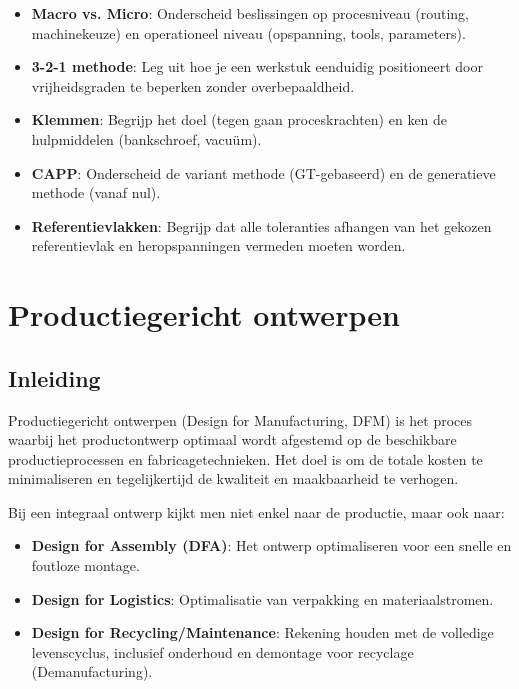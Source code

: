 \documentclass[a4paper,12pt,twoside]{report}
\begin{document}
\begin{warningbox}[title=EXAMEN CHECKLIST: WERKVOORBEREIDING]
    \begin{itemize}
        \item \textbf{Macro vs. Micro}: Onderscheid beslissingen op procesniveau (routing, machinekeuze) en operationeel niveau (opspanning, tools, parameters).
        \item \textbf{3-2-1 methode}: Leg uit hoe je een werkstuk eenduidig positioneert door vrijheidsgraden te beperken zonder overbepaaldheid.
        \item \textbf{Klemmen}: Begrijp het doel (tegen gaan proceskrachten) en ken de hulpmiddelen (bankschroef, vacuüm).
        \item \textbf{CAPP}: Onderscheid de variant methode (GT-gebaseerd) en de generatieve methode (vanaf nul).
        \item \textbf{Referentievlakken}: Begrijp dat alle toleranties afhangen van het gekozen referentievlak en heropspanningen vermeden moeten worden.
    \end{itemize}
\end{warningbox}

\chapter{Productiegericht ontwerpen}
\section{Inleiding}
Productiegericht ontwerpen (Design for Manufacturing, DFM) is het proces waarbij het productontwerp optimaal wordt afgestemd op de beschikbare productieprocessen en fabricagetechnieken. Het doel is om de totale kosten te minimaliseren en tegelijkertijd de kwaliteit en maakbaarheid te verhogen.

Bij een integraal ontwerp kijkt men niet enkel naar de productie, maar ook naar:
\begin{itemize}
	\item \textbf{Design for Assembly (DFA)}: Het ontwerp optimaliseren voor een snelle en foutloze montage.
	\item \textbf{Design for Logistics}: Optimalisatie van verpakking en materiaalstromen.
	\item \textbf{Design for Recycling/Maintenance}: Rekening houden met de volledige levenscyclus, inclusief onderhoud en demontage voor recyclage (Demanufacturing).
\end{itemize}
\end{document}
